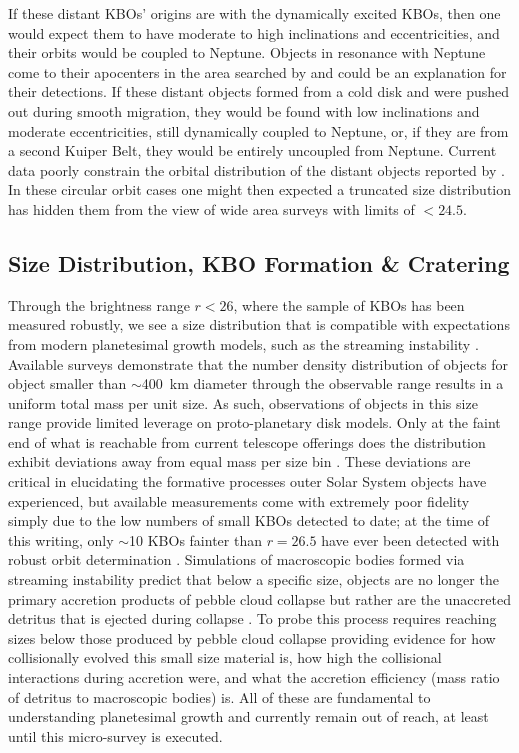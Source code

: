 \documentclass[modern,linenumbers,trackchanges,preprint]{aastex631}
\begin{document}
If these distant KBOs' origins are with the dynamically excited KBOs, then one would expect them to have moderate to high inclinations and eccentricities, and their orbits would be coupled to Neptune. 
Objects in resonance with Neptune come to their apocenters in the area searched by \citet{Fraser2024PSJ} and could be an explanation for their detections. 
If these distant objects formed from a cold disk and were pushed out during smooth migration, they would be found with low inclinations and moderate eccentricities, still dynamically coupled to Neptune, or, if they are from a second Kuiper Belt, they would be entirely uncoupled from Neptune. Current data poorly constrain the orbital distribution of the distant objects reported by \citet{Fraser2024PSJ}.  
In these circular orbit cases one might then expected a truncated size distribution has hidden them from the view of wide area surveys with limits of $<24.5$.

\subsection{Size Distribution, KBO Formation \& Cratering} 
Through the brightness range $r<26$, where the sample of KBOs has been measured robustly, we see a size distribution that is compatible with expectations from modern planetesimal growth models, such as the streaming instability \citep{Kavelaars2021, Petit2023, Napier2023}. 
Available surveys demonstrate that the number density distribution of objects for object smaller than $\sim$400~km diameter through the observable range results in a uniform total mass per unit size. 
As such, observations of objects in this size range provide limited leverage on proto-planetary disk models. 
Only at the faint end of what is reachable from current telescope offerings does the distribution exhibit deviations away from equal mass per size bin \citep{Napier2023}. 
These deviations are critical in elucidating the formative processes outer Solar System objects have experienced, but available measurements come with extremely poor fidelity simply due to the low numbers of small KBOs detected to date; at the time of this writing, only $\sim$10 KBOs fainter than $r=26.5$ have ever been detected with robust orbit determination \citep{Bernstein2004, Smotherman2024}. 
Simulations of macroscopic bodies formed via streaming instability predict that below a specific size, objects are no longer the primary accretion products of pebble cloud collapse but rather are the unaccreted detritus that is ejected during collapse \citep[e.g.,][]{Robinson2020, Polak2023}. 
To probe this process requires reaching sizes below those produced by pebble cloud collapse providing evidence for how collisionally evolved this small size material is, how high the collisional interactions during accretion were, and what the accretion efficiency (mass ratio of detritus to macroscopic bodies) is. 
All of these are fundamental to understanding planetesimal growth and currently remain out of reach, at least until this micro-survey is executed.
\end{document}
